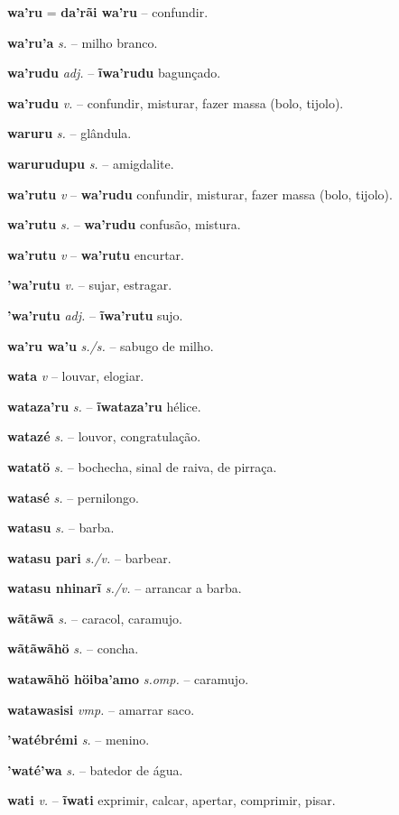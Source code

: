 \textbf{wa'ru} \textit{} = \textbf{da'rãi wa'ru} -- confundir.

\textbf{wa'ru'a} \textit{s.} -- milho branco.

\textbf{wa'rudu} \textit{adj.} -- \textbf{ĩwa'rudu} bagunçado.

\textbf{wa'rudu} \textit{v.} -- confundir, misturar, fazer massa (bolo, tijolo).

\textbf{waruru} \textit{s.} -- glândula.

\textbf{warurudupu} \textit{s.} -- amigdalite.

\textbf{wa'rutu} \textit{v} -- \textbf{wa'rudu} confundir, misturar, fazer massa (bolo, tijolo).

\textbf{wa'rutu} \textit{s.} -- \textbf{wa'rudu} confusão, mistura.

\textbf{wa'rutu} \textit{v} -- \textbf{wa'rutu} encurtar.

\textbf{'wa'rutu} \textit{v.} -- sujar, estragar.

\textbf{'wa'rutu} \textit{adj.} -- \textbf{ĩwa'rutu} sujo.

\textbf{wa'ru wa'u} \textit{s./s.} -- sabugo de milho.

\textbf{wata} \textit{v} -- louvar, elogiar.

\textbf{wataza'ru} \textit{s.} -- \textbf{ĩwataza'ru} hélice.

\textbf{watazé} \textit{s.} -- louvor, congratulação.

\textbf{watatö} \textit{s.} -- bochecha, sinal de raiva, de pirraça.

\textbf{watasé} \textit{s.} -- pernilongo.

\textbf{watasu} \textit{s.} -- barba.

\textbf{watasu pari} \textit{s./v.} -- barbear.

\textbf{watasu nhinarĩ} \textit{s./v.} -- arrancar a barba.

\textbf{wãtãwã} \textit{s.} -- caracol, caramujo.

\textbf{wãtãwãhö} \textit{s.} -- concha.

\textbf{watawãhö höiba'amo} \textit{s.omp.} -- caramujo.

\textbf{watawasisi} \textit{vmp.} -- amarrar saco.

\textbf{'watébrémi} \textit{s.} -- menino.

\textbf{'waté'wa} \textit{s.} -- batedor de água.

\textbf{wati} \textit{v.} -- \textbf{ĩwati} exprimir, calcar, apertar, comprimir, pisar.

